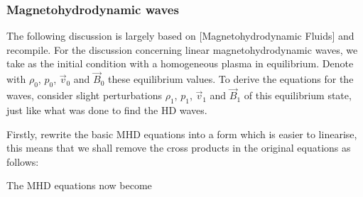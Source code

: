 \subsubsection{Magnetohydrodynamic waves}
\label{sec:MHD-waves}

The following discussion is largely based on \cite{site-mhd-waves} [Magnetohydrodynamic Fluids] and \cite{notes-principles-MHD}recompile.
For the discussion concerning linear magnetohydrodynamic waves, we take as the initial condition with a homogeneous plasma in equilibrium.
Denote with $\rho_0$, $p_0$, $\vec{v}_0$ and $\vec{B}_0$ these equilibrium values. 
To derive the equations for the waves, consider slight perturbations $\rho_1$, $p_1$, $\vec{v}_1$ and $\vec{B}_1$ of this equilibrium state, just like what was done to find the HD waves.

Firstly, rewrite the basic MHD equations into a form which is easier to linearise,
this means that we shall remove the cross products in the original equations as follows:

{\centering 
{}
\par}


The MHD equations now become

{\centering 
\noindent {}
\par}


